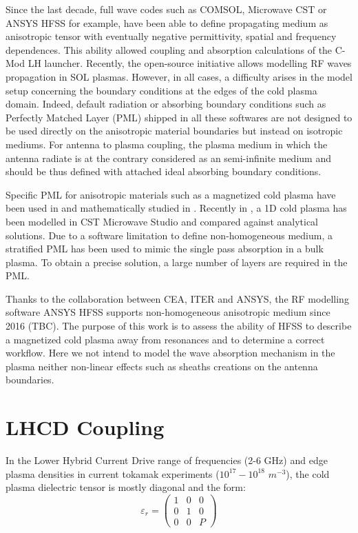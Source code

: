 \documentclass[preprint,3p,twocolumn]{elsarticle}
\begin{document}
Since the last decade, full wave codes such as {COMSOL}, Microwave {CST} or {ANSYS} {HFSS} for example, have been able to define propagating medium as anisotropic tensor with eventually negative permittivity, spatial and frequency dependences. This ability allowed coupling\cite{Meneghini2009g, Shiraiwa2009} and absorption\cite{Meneghini2009} calculations of the C-Mod LH launcher. Recently, the open-source initiative \cite{Shiraiwa2017} allows modelling RF waves propagation in SOL plasmas. However, in all cases, a difficulty arises in the model setup concerning the boundary conditions at the edges of the cold plasma domain. Indeed, default radiation or absorbing boundary conditions such as Perfectly Matched Layer (PML) shipped in all these softwares are not designed to be used directly on the anisotropic material boundaries but instead on isotropic mediums. For antenna to plasma coupling, the plasma medium in which the antenna radiate is at the contrary considered as an semi-infinite medium and should be thus defined with attached ideal absorbing boundary conditions. 

Specific PML for anisotropic materials such as a magnetized cold plasma have been used in \cite{Jacquot2013b} and mathematically studied in  \cite{Becache2016, Becache2018}. Recently in \cite{Louche2017}, a 1D cold plasma has been modelled in CST Microwave Studio and compared against analytical solutions. Due to a software limitation to define non-homogeneous medium, a stratified PML has been used to mimic the single pass absorption in a bulk plasma. To obtain a precise solution, a large number of layers are required in the PML. 

Thanks to the collaboration between CEA, ITER and ANSYS, the RF modelling software ANSYS HFSS supports non-homogeneous anisotropic medium since 2016 (TBC). The purpose of this work is to assess the ability of HFSS to describe a magnetized cold plasma away from resonances and to determine a correct workflow. Here we not intend to model the wave absorption mechanism in the plasma neither non-linear effects such as sheaths creations on the antenna boundaries. 




\section{LHCD Coupling}
In the Lower Hybrid Current Drive range of frequencies (2-6 GHz) and edge plasma densities in current tokamak experiments ($10^{17}-10^{18}$ $m^{-3}$), the cold plasma dielectric tensor is mostly diagonal and the form:
\begin{equation}
\varepsilon_r 
=
\left(
\begin{array}{ccc}
1 & 0 & 0 \\
0 & 1 & 0 \\
0 & 0 & P
\end{array}
\right)
\end{equation}
\end{document}
